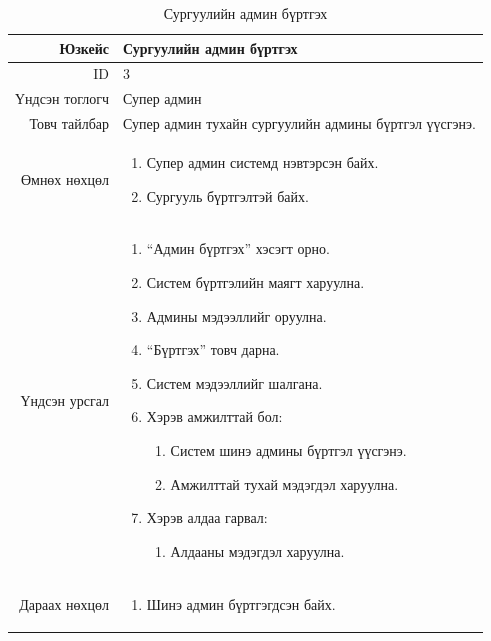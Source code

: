 \begin{longtable}{|r|p{11cm}|}
\caption{Сургуулийн админ бүртгэх}
\label{table:usecase3}\\ \hline
Юзкейс & Сургуулийн админ бүртгэх \\ \hline
ID & 3 \\ \hline
Үндсэн тоглогч & Супер админ \\ \hline
Товч тайлбар & Супер админ тухайн
сургуулийн админы бүртгэл үүсгэнэ. \\ \hline
Өмнөх нөхцөл &
\begin{enumerate}[nosep]
\item Супер админ системд нэвтэрсэн байх.
\item Сургууль бүртгэлтэй байх.
\end{enumerate} \\ \hline
Үндсэн урсгал &
\begin{enumerate}[nosep]
\item ``Админ бүртгэх'' хэсэгт орно.
\item Систем бүртгэлийн маягт харуулна.
\item Админы мэдээллийг оруулна.
\item ``Бүртгэх'' товч дарна.
\item Систем мэдээллийг шалгана.
\item Хэрэв амжилттай бол:
\begin{enumerate}[nosep,label*=\arabic*.]
\item Систем шинэ админы бүртгэл үүсгэнэ.
\item Амжилттай тухай мэдэгдэл харуулна.
\end{enumerate}
\item Хэрэв алдаа гарвал:
\begin{enumerate}[nosep,label*=\arabic*.]
\item Алдааны мэдэгдэл харуулна.
\end{enumerate}
\end{enumerate} \\ \hline
Дараах нөхцөл &
\begin{enumerate}[nosep]
\item Шинэ админ бүртгэгдсэн байх.
\end{enumerate} \\ \hline
\end{longtable}

